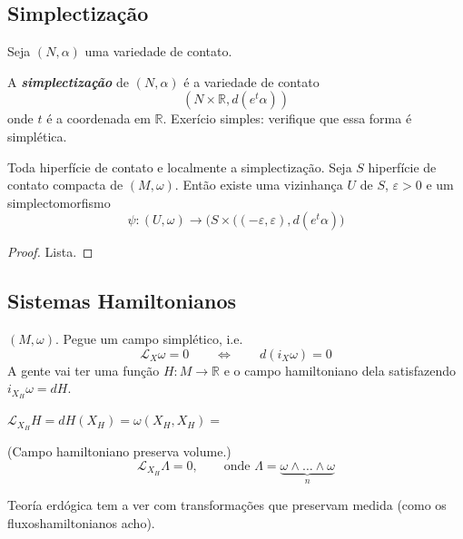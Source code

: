 \subsection{Simplectização}

Seja $(N,\alpha)$ uma variedade de contato.

\begin{defn}\leavevmode
	A \textit{\textbf{simplectização}} de $(N,\alpha)$ é a variedade de contato
	\[(N\times \mathbb{R},d(e^t\alpha))\]
	onde $t$ é a coordenada em $\mathbb{R}$. {\color{4}Exerício simples:} verifique que essa forma é simplética.
\end{defn}

\begin{thm}\leavevmode
	{\color{4}Toda hiperfície de contato e localmente a simplectização.} Seja $S$ hiperfície de contato compacta de $(M,\omega)$. Então existe uma vizinhança $U$ de $S$, $\varepsilon>0$ e um simplectomorfismo
	\[\psi:(U,\omega)\longrightarrow (S\times \Big((-\varepsilon,\varepsilon),d(e^t\alpha)\Big)\]
\end{thm}

\begin{proof}\leavevmode
	Lista.
\end{proof}

\subsection{Sistemas Hamiltonianos}

$(M,\omega)$. Pegue um campo simplético, i.e.
\[\mathcal{L}_X\omega=0\qquad \iff\qquad d(i_X\omega)=0\]
A gente vai ter uma função $H:M\to \mathbb{R}$ e o campo hamiltoniano dela satisfazendo $i_{X_H}\omega=dH$.

\begin{remark}\leavevmode
	$\mathcal{L}_{X_H}H=dH(X_H)=\omega(X_H,X_H)=$
\end{remark}

\begin{coro}\leavevmode
	{\color{3}(Campo hamiltoniano preserva volume.)}
	\[\mathcal{L}_{X_H}\Lambda=0,\qquad \text{onde }\Lambda=\underbrace{\omega\wedge \ldots \wedge \omega}_{n} \]
\end{coro}

\begin{remark}\leavevmode
	Teoría erdógica tem a ver com transformações que preservam medida (como os fluxoshamiltonianos acho).
\end{remark}

